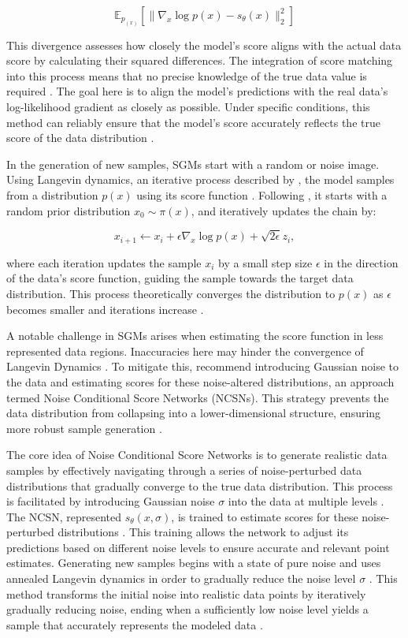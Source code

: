\[
\mathbb{E}_{p_{(x)}} \left[ \| \nabla_x \log{p(x)} - s_\theta(x) \| ^2_2 \right]
\] 

This divergence assesses how closely the model's score aligns with the actual data score by calculating their squared differences. The integration of score matching into this process means that no precise knowledge of the true data value is required \citep{song2021score}. The goal here is to align the model's predictions with the real data's log-likelihood gradient as closely as possible. Under specific conditions, this method can reliably ensure that the model's score accurately reflects the true score of the data distribution \citep{song2019SGM}.

In the generation of new samples, SGMs start with a random or noise image. Using Langevin dynamics, an iterative process described by \citep{robertsLangevin}, the model samples from a distribution \( p(x) \) using its score function \citep{song2021score}. Following \citeauthor{song2021score}, it starts with a random prior distribution \( x_0 \sim \pi(x) \), and iteratively updates the chain by:

\[ 
  x_{i+1} \leftarrow x_i + \epsilon \nabla_x \log p(x) + \sqrt{2 \epsilon} z_i,
\]

where each iteration updates the sample \(x_i\) by a small step size \(\epsilon\) in the direction of the data's score function, guiding the sample towards the target data distribution. This process theoretically converges the distribution to \( p(x) \) as \( \epsilon \) becomes smaller and iterations increase \citep{song2019SGM,song2021score}.

A notable challenge in SGMs arises when estimating the score function in less represented data regions. Inaccuracies here may hinder the convergence of Langevin Dynamics \citep{song2019SGM}. To mitigate this, \citeauthor{song2019SGM} recommend introducing Gaussian noise to the data and estimating scores for these noise-altered distributions, an approach termed Noise Conditional Score Networks (NCSNs). This strategy prevents the data distribution from collapsing into a lower-dimensional structure, ensuring more robust sample generation \citep{song2019SGM}.

The core idea of Noise Conditional Score Networks is to generate realistic data samples by effectively navigating through a series of noise-perturbed data distributions that gradually converge to the true data distribution. This process is facilitated by introducing Gaussian noise \(\sigma\) into the data at multiple levels \citep{song2019SGM}. The NCSN, represented \(s_\theta(x, \sigma)\),  is trained to estimate scores for these noise-perturbed distributions \citep{song2019SGM}. This training allows the network to adjust its predictions based on different noise levels to ensure accurate and relevant point estimates. Generating new samples begins with a state of pure noise and uses annealed Langevin dynamics in order to gradually reduce the noise level \(\sigma\) \citep{song2019SGM}. This method transforms the initial noise into realistic data points by iteratively gradually reducing noise, ending when a sufficiently low noise level yields a sample that accurately represents the modeled data \citep{song2019SGM}.


